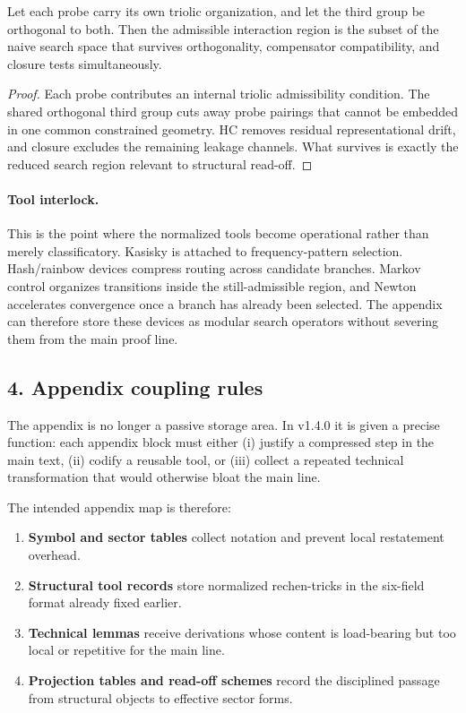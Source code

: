 \begin{lemma}
\label{lem:probe-reduction-lemma}
Let each probe carry its own triolic organization, and let the third group be
orthogonal to both. Then the admissible interaction region is the subset of the
naive search space that survives orthogonality, compensator compatibility, and
closure tests simultaneously.
\end{lemma}

\begin{proof}
Each probe contributes an internal triolic admissibility condition. The shared
orthogonal third group cuts away probe pairings that cannot be embedded in one
common constrained geometry. HC removes residual representational drift, and
closure excludes the remaining leakage channels. What survives is exactly the
reduced search region relevant to structural read-off.
\end{proof}

\paragraph{Tool interlock.}
This is the point where the normalized tools become operational rather than
merely classificatory. Kasisky is attached to frequency-pattern selection.
Hash/rainbow devices compress routing across candidate branches. Markov control
organizes transitions inside the still-admissible region, and Newton
accelerates convergence once a branch has already been selected. The appendix
can therefore store these devices as modular search operators without severing
them from the main proof line.

\subsection*{4. Appendix coupling rules}
The appendix is no longer a passive storage area. In v1.4.0 it is given a
precise function: each appendix block must either (i) justify a compressed step
in the main text, (ii) codify a reusable tool, or (iii) collect a repeated
technical transformation that would otherwise bloat the main line.

The intended appendix map is therefore:
\begin{enumerate}[leftmargin=2em]
  \item \textbf{Symbol and sector tables} collect notation and prevent local
  restatement overhead.
  \item \textbf{Structural tool records} store normalized rechen-tricks in the
  six-field format already fixed earlier.
  \item \textbf{Technical lemmas} receive derivations whose content is
  load-bearing but too local or repetitive for the main line.
  \item \textbf{Projection tables and read-off schemes} record the disciplined
  passage from structural objects to effective sector forms.
\end{enumerate}


